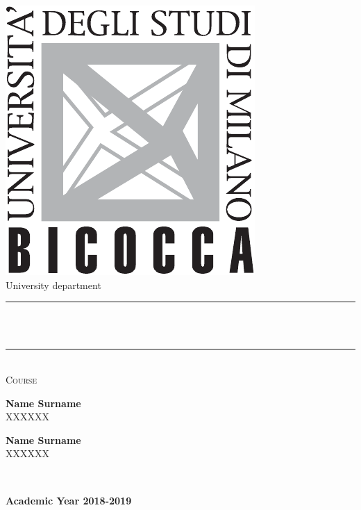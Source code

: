 \newpage
\pagestyle{empty} %
\noindent

\begin{titlepage}
	\centering
	\includegraphics[scale = 0.5]{logo.pdf}\\[1 cm]
	{\large University department}\\[1.2 
	cm]	
	\rule{\linewidth}{0.2 mm} \\[0.4 cm]
	{ \huge \bfseries \thetitle}\\
	\rule{\linewidth}{0.2 mm} \\[1.0 cm]
	
	\textsc{\Large Course}\\[2.2 cm]	
	
		\begin{minipage}{.4\linewidth}
			\begin{flushleft}                           
				\textbf{Name Surname} \\
				\quad \: {XXXXXX}
			\end{flushleft} 
		\end{minipage}
		\hspace{-90mm}
		\begin{minipage}{.4\linewidth}
			\begin{flushright}                                      
				\textbf{Name Surname} \\ 
				{XXXXXX}\quad \: { }
			\end{flushright} 
		\end{minipage}\\[1 cm]

	\begin{center} \textbf{Academic Year 2018-2019 }\end{center}
	
\end{titlepage}